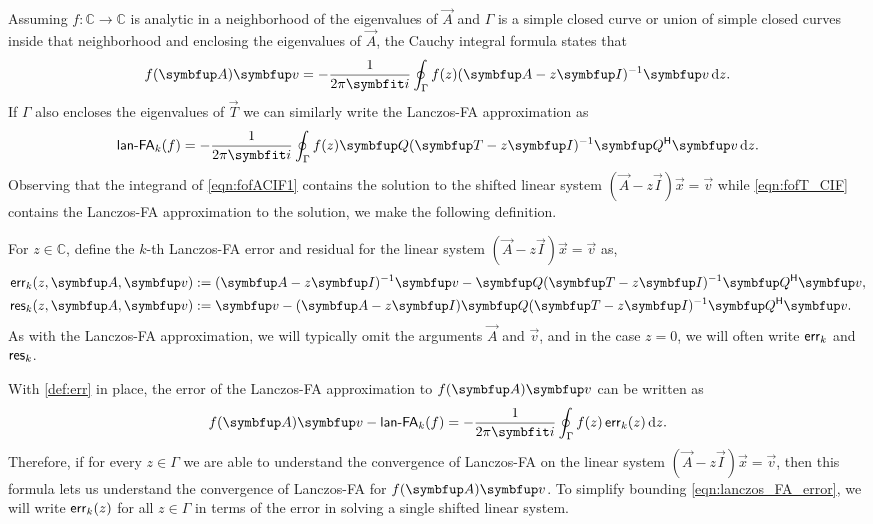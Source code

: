 Assuming \( f : \mathbb{C} \rightarrow \mathbb{C} \) is analytic in a neighborhood of the eigenvalues of \( \vec{A} \) and \( \Gamma \) is a simple closed curve or union of simple closed curves inside that neighborhood and enclosing the eigenvalues of \( \vec{A} \), the Cauchy integral formula states that
\begin{equation}
    \label{eqn:fofACIF1}
    \fA\vec{v} = - \frac{1}{2\pi \ii} \oint_{\Gamma} f(z) (\vec{A} - z \vec{I} )^{-1} \vec{v} \, \d{z}.
\end{equation}
If \( \Gamma \) also encloses the eigenvalues of \( \vec{T} \) we can similarly write the Lanczos-FA approximation as
\begin{equation}
\label{eqn:fofT_CIF}
    \lan_k(f)
    = - \frac{1}{2\pi \ii} \oint_{\Gamma} f(z) \vec{Q} (\vec{T} - z \vec{I} )^{-1} \vec{Q}^\cT \vec{v} \, \d{z} .
\end{equation}
Observing that the integrand of \cref{eqn:fofACIF1} contains the solution to the shifted linear system \( (\vec{A}-z\vec{I}) \vec{x} = \vec{v} \) while  \cref{eqn:fofT_CIF} contains the Lanczos-FA approximation to the solution, we make the following definition.
\begin{definition}\label{def:err}
For \( z \in \mathbb{C} \), %
define the \( k \)-th Lanczos-FA error and residual for the linear system \( (\vec{A}-z\vec{I}) \vec{x} = \vec{v} \) as,
\begin{align*}
    \err_k(z,\vec{A},\vec{v}) &:= (\vec{A} - z \vec{I})^{-1} \vec{v} - \vec{Q}(\vec{T}-z\vec{I})^{-1}\vec{Q}^\cT \vec{v}%
    ,\\
    \Res_k(z,\vec{A},\vec{v}) &:= \vec{v} - (\vec{A} - z \vec{I}) \vec{Q}(\vec{T}-z\vec{I})^{-1}\vec{Q}^\cT \vec{v}.%
\end{align*}
As with the Lanczos-FA approximation, we will typically omit the arguments \( \vec{A} \) and \( \vec{v} \), and in the case \( z = 0 \), we will often write \( \textup{\textsf{err}}_k \) and \( \textup{\textsf{res}}_k \).
\end{definition}
With \cref{def:err} in place, the error of the Lanczos-FA approximation to \( \fA\vec{v} \) can be written as
\begin{equation}
    \label{eqn:lanczos_FA_error}
    \fA \vec{v} - \lan_k(f)%
    = - \frac{1}{2\pi \ii} \oint_{\Gamma} f(z) \, \err_k(z) \, \d{z}.
\end{equation}
Therefore, if for every $z\in\Gamma$ we are able to understand the convergence of Lanczos-FA on the linear system \( (\vec{A}-z\vec{I}) \vec{x} = \vec{v} \), then this formula lets us understand the convergence of Lanczos-FA for \( \fA\vec{v} \).
To simplify bounding \cref{eqn:lanczos_FA_error}, we will write $\textup{\textsf{err}}_k(z)$ for all  \( z\in\Gamma \) in terms of the error in solving a single shifted linear system.

